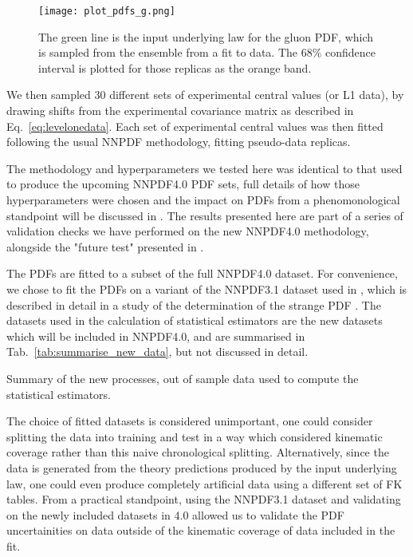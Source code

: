 \begin{figure}
    \centering
    \texttt{[image: plot\_pdfs\_g.png]}
    \caption{The green line is the input underlying law for the gluon PDF,
    which is sampled from the ensemble from a fit to data. The 68\% confidence
    interval is plotted for those replicas as the orange band.}
    \label{fig:InputGluonPDF}
\end{figure}

We then sampled 30 different sets of experimental central values (or L1 data),
by drawing
shifts from the experimental covariance matrix as described in
Eq.~\ref{eq:levelonedata}. Each set of experimental central values was then
fitted following the usual NNPDF methodology, fitting pseudo-data replicas.

The methodology and hyperparameters we tested here was identical to that used
to produce the upcoming NNPDF4.0 PDF sets, full details of how those hyperparameters
were chosen and the impact on PDFs from a phenomonological standpoint will be
discussed in \cite{NNPDF40}. %
The results presented here are part of a series of validation checks we have performed
on the new NNPDF4.0 methodology, alongside the "future test" presented in
\cite{Cruz_Martinez_2021}.

The PDFs are fitted to a subset of the full NNPDF4.0 dataset. For convenience,
we chose to fit the PDFs on a variant of the NNPDF3.1 dataset used in
\cite{Ball_2018}, which is described in detail in a study of the determination
of the strange PDF \cite{Faura_2020}. The datasets used in the calculation of
statistical estimators are the new datasets which will be included in NNPDF4.0,
and are summarised in Tab.~\ref{tab:summarise_new_data}, but not discussed in detail.

\begin{table}[h!]
    
    \caption{Summary of the new processes, out of sample data used to compute the statistical estimators.}
    \label{tab:summarise_new_data}
\end{table}

The choice of fitted datasets is
considered unimportant, one could consider splitting the data into training
and test in a way which considered kinematic coverage rather than this
naive chronological splitting. Alternatively, since the data is generated from
the theory predictions produced by the input underlying law, one could even
produce completely artificial data using a different set of FK tables. From a
practical standpoint, using the NNPDF3.1 dataset and validating on the newly
included
datasets in 4.0 allowed us to validate the PDF uncertainities on data outside
of the kinematic coverage of data included in the fit.

